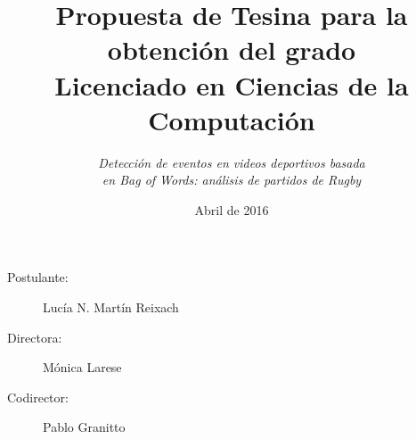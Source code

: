 \documentclass[10pt]{article}
\begin{document}
\date{Abril de 2016}
\title{Propuesta de Tesina para la obtención del grado\\Licenciado en Ciencias de la Computación}
\author{\textit{\large Detección de eventos en videos deportivos basada} \\ \textit{\large en Bag of Words: análisis de partidos de Rugby}}

\maketitle

\begin{description}
  \item[Postulante:] Lucía N. Martín Reixach
  \item[Directora:] Mónica Larese
  \item[Codirector:] Pablo Granitto
\end{description}












\nocite{yang2007evaluating}
\printbibliography

%
\end{document}
